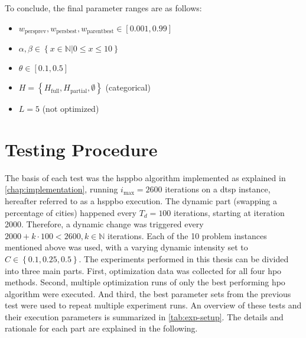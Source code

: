To conclude, the final parameter ranges are as follows:
\begin{itemize}
	\item $w_{\text{persprev}}, w_{\text{persbest}}, w_{\text{parentbest}} \in [0.001,0.99]$
	\item $\alpha, \beta \in \left\lbrace x\in\mathbb{N} | 0 \leq x \leq 10 \right\rbrace$
	\item $\theta \in [0.1,0.5]$
	\item $H = \left\lbrace H_{\text{full}}, H_{\text{partial}}, \emptyset \right\rbrace$ (categorical)
	\item $L = 5$ (not optimized)
	
\end{itemize}

\section{Testing Procedure}
\label{chap:testing}

The basis of each test was the \gls{hsppbo} algorithm implemented as explained in \cref{chap:implementation}, running $i_\text{max} = 2600$ iterations on a \gls{dtsp} instance, hereafter referred to as a \gls{hsppbo} execution. The dynamic part (swapping a percentage of cities) happened every $T_d = 100$ iterations, starting at iteration 2000. Therefore, a dynamic change was triggered every $2000 + k \cdot 100 < 2600, k \in \mathbb{N}$ iterations. Each of the 10 problem instances mentioned above was used, with a varying dynamic intensity set to $C \in \left\lbrace 0.1,0.25,0.5\right\rbrace$. The experiments performed in this thesis can be divided into three main parts. First, optimization data was collected for all four \gls{hpo} methods. Second, multiple optimization runs of only the best performing \gls{hpo} algorithm were executed. And third, the best parameter sets from the previous test were used to repeat multiple experiment runs. An overview of these tests and their execution parameters is summarized in \cref{tab:exp-setup}. The details and rationale for each part are explained in the following. 

